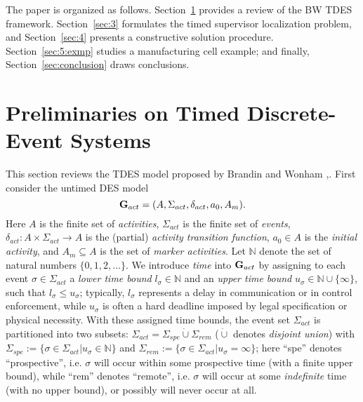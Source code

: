 \documentclass[twocolumn]{autart}
\begin{document}
The paper is organized as follows. Section~\ref{sec:2} provides a
review of the BW TDES framework. Section~\ref{sec:3}
formulates the timed supervisor localization problem, and
Section~\ref{sec:4} presents a constructive solution procedure.
Section~\ref{sec:5:exmp} studies a manufacturing cell example; and finally,
Section~\ref{sec:conclusion} draws conclusions.


\section{Preliminaries on Timed Discrete-Event Systems} \label{sec:2}

This section reviews the TDES model proposed by Brandin and Wonham
\cite{BrandinWonham:94},\cite[Chapter~9]{Wonham:2011a}. First
consider the untimed DES model
\begin{equation} \label{e1}
{\bf G}_{act} = (A, \Sigma_{act}, \delta_{act}, a_0, A_m).
\end{equation}
Here $A$ is the finite set of {\it activities}, $\Sigma_{act}$ is
the finite set of {\it events}, $\delta_{act}:A \times \Sigma_{act}
\to A$ is the (partial) {\it activity transition function}, $a_0 \in
A$ is the {\it initial activity}, and $A_m \subseteq A$ is the set
of {\it marker activities}. Let $\mathbb{N}$ denote the set of
natural numbers $\{0,1,2,...\}$. We introduce \emph{time} into ${\bf
G}_{act}$ by assigning to each event $\sigma \in \Sigma_{act}$ a
{\it lower time bound} $l_\sigma \in \mathbb{N}$ and an {\it upper
time bound} $u_\sigma \in \mathbb{N} \cup\{\infty\}$, such that
$l_\sigma \leq u_\sigma$; typically, $l_\sigma$ represents a delay
in communication or in control enforcement, while $u_\sigma$ is
often a hard deadline imposed by legal specification or physical
necessity. With these assigned time bounds, the event set
$\Sigma_{act}$ is partitioned into two subsets: $\Sigma_{act} =
\Sigma_{spe} \dot\cup \Sigma_{rem}$ ($\dot\cup$ denotes
\emph{disjoint union}) with $\Sigma_{spe} := \{\sigma \in
\Sigma_{act}|u_\sigma \in \mathbb{N}\}$ and $\Sigma_{rem} :=
\{\sigma \in \Sigma_{act} | u_\sigma = \infty\}$; here ``spe''
denotes ``prospective'', i.e. $\sigma$ will occur within some
prospective time (with a finite upper bound), while ``rem'' denotes
``remote'', i.e. $\sigma$ will occur at some \emph{indefinite} time
(with no upper bound), or possibly will never occur at all.
\end{document}
